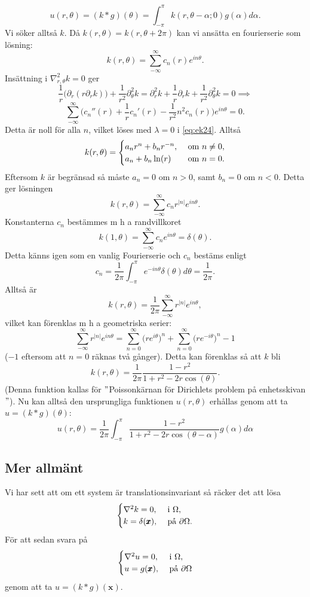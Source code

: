 \documentclass{article}
\begin{document}
$$
u(r,\theta)=(k*g)(\theta)=\int_{-\pi}^{\pi}k(r,\theta-\alpha;0)g(\alpha)d\alpha.
$$
Vi söker alltså $k$. Då $k(r,\theta)=k(r,\theta+2\pi)$ kan vi ansätta en fourierserie som lösning:
$$
k(r,\theta)=\sum_{-\infty}^{\infty}c_n(r)e^{in\theta}.
$$
Insättning i $\nabla_{r,\theta}^2k=0$ ger
$$
\frac{1}{r}\big(\partial_r (r\partial_rk)\big)+\frac{1}{r^2}\partial_{\theta}^2k=\partial_r^2k+\frac{1}{r}\partial_rk+\frac{1}{r^2}\partial_{\theta}^2k=0\implies
$$
$$
\sum_{-\infty}^{\infty}\Big(c_n''(r)+\frac{1}{r}c_n'(r)-\frac{1}{r^2}n^2c_n(r)\Big)e^{in\theta}=0.
$$
Detta är noll för alla $n$, vilket löses med $\lambda=0$ i \eqref{eq:ek24}. Alltså
\begin{equation}
    k(r,\theta)=\begin{cases}
        a_nr^n+b_nr^{-n}, \ &$om$ \ n\neq0,\\
        a_n+b_n\ln(r) \ &$om$ \ n=0.
    \end{cases}
\end{equation}
Eftersom $k$ är begränsad så måste $a_n=0$ om $n>0$, samt $b_n=0$ om $n<0$. Detta ger lösningen
$$
k(r,\theta)=\sum_{-\infty}^{\infty}c_nr^{|n|}e^{in\theta}.
$$
Konstanterna $c_n$ bestämmes m h a randvillkoret
$$
k(1,\theta)=\sum_{-\infty}^{\infty}c_ne^{in\theta}=\delta(\theta).
$$
Detta känns igen som en vanlig Fourierserie och $c_n$ bestäms enligt
$$
c_n=\frac{1}{2\pi}\int_{-\pi}^{\pi}e^{-in\theta}\delta(\theta)d\theta=\frac{1}{2\pi}.
$$
Alltså är
$$
k(r,\theta)=\frac{1}{2\pi}\sum_{-\infty}^{\infty}r^{|n|}e^{in\theta},
$$
vilket kan förenklas m h a geometriska serier:
$$
\sum_{-\infty}^{\infty}r^{|n|}e^{in\theta}=\sum_{n=0}^{\infty}\big(re^{i\theta}\big)^n+\sum_{n=0}^{\infty}\big(re^{-i\theta}\big)^n-1
$$
($-1$ eftersom att $n=0$ räknas två gånger). Detta kan förenklas så att $k$ bli
$$
k(r,\theta)=\frac{1}{2\pi}\frac{1-r^2}{1+r^2-2r\cos(\theta)}.
$$
(Denna funktion kallas för $"$Poissonkärnan för Dirichlets problem på enhetsskivan$"$). Nu kan alltså den ursprungliga funktionen $u(r,\theta)$ erhållas genom att ta $u=(k*g)(\theta)$:
$$
u(r,\theta)=\frac{1}{2\pi}\int_{-\pi}^{\pi}\frac{1-r^2}{1+r^2-2r\cos(\theta-\alpha)}g(\alpha)d\alpha
$$
\subsection{Mer allmänt}
Vi har sett att om ett system är translationsinvariant så räcker det att lösa 
\begin{equation}
    \begin{cases}
        \nabla^2k=0, \ &$i$ \ \Omega,\\ k=\delta(\pmb{x}), \ &$på$ \ \partial\Omega.
    \end{cases}
\end{equation}
För att sedan svara på
\begin{equation}
    \begin{cases}
        \nabla^2u=0, \ &$i$ \ \Omega,\\ u=g(\pmb{x}), \ &$på$ \ \partial\Omega
    \end{cases}
\end{equation}
genom att ta $u=(k*g)(\pmb{x})$.
\end{document}
